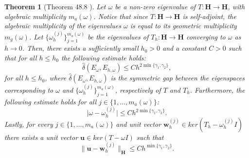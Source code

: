 \documentclass[USenglish]{article}
\theoremstyle{dgthm}
\newtheorem{theorem}{Theorem}
\theoremstyle{dgdef}
\let\vec\bm
\newcommand\norm[1]{\lVert#1\rVert}
\newcommand\abs[1]{\lvert#1\rvert}
\begin{document}
\begin{theorem}[Theorem 48.8 \cite{ErnGuermond}]
  Let $\omega$ be a non-zero eigenvalue of $T:\vec{H}\to\vec{H}$, with algebraic multiplicity $m_a(\omega)$. Notice that since $T:\vec{H}\to\vec{H}$ is self-adjoint, the algebraic multiplicity of the eigenvalues $\omega$ is equal to its geometric multiplicity $m_g(\omega)$.
  Let $\{\omega_h^{(j)}\}_{j=1}^{m_a(\omega)}$ be the eigenvalues of $T_h:\vec{H}\to\vec{H}$ converging to $\omega$ as $h\to 0$.
  Then, there exists a sufficiently small $h_0>0$ and a constant $C>0$ such that for all $h\leq h_0$ the following estimate holds:
  \begin{equation}
    \hat{\delta}(E_\omega,E_{h,\omega}) \leq C h^{2\min\{\gamma_1,\gamma_2\}},
  \end{equation}
  for all $h\leq h_0$, where $\hat{\delta}(E_\omega,E_{h,\omega})$ is the symmetric gap between the eigenspaces corresponding to $\omega$ and $\{\omega_h^{(j)}\}_{j=1}^{m_a(\omega)}$, respectively of $T$ and $T_h$.
  Furthermore, the following estimate holds for all $j\in \{1,\ldots,m_a(\omega)\}$:
  \begin{equation}
    \abs{\omega-\omega_h^{(j)}} \leq C h^{2\min\{\gamma_1,\gamma_2\}}.
  \end{equation} 
  Lastly, for every $j\in \{1,\ldots,m_a(\omega)\}$ and unit vector $\vec{w}_h^{(j)}\in ker\left(T_h-\omega_{h}^{(j)}I\right)$ there exists a unit vector $\vec{u}\in ker\left(T-\omega I\right)$ such that
  \begin{equation}
    \norm{\vec{u}-\vec{w}_h^{(j)}}_{\vec{H}}\leq C h^{\min\{\gamma_1,\gamma_2\}}.
  \end{equation}
\end{theorem}
\end{document}
